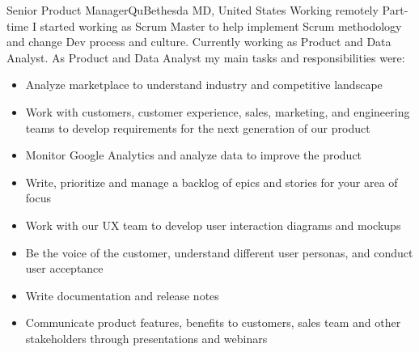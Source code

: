 \documentclass[11pt,a4paper,sans]{moderncv}
\begin{document}
 {Senior Product Manager}{Qu}{Bethesda MD, United States \- Working remotely \- Part-time }{}
{
  I started working as Scrum Master to help implement Scrum methodology and change Dev process and culture. Currently working as Product and Data Analyst.
  \newline{}
}
{
  As Product and Data Analyst my main tasks and responsibilities were:
}
\begin{itemize}
  \item Analyze marketplace to understand industry and competitive landscape
  \item Work with customers, customer experience, sales, marketing, and engineering teams to develop requirements for the next generation of our product
  \item Monitor Google Analytics and analyze data to improve the product
  \item Write, prioritize and manage a backlog of epics and stories for your area of focus
  \item Work with our UX team to develop user interaction diagrams and mockups
  \item Be the voice of the customer, understand different user personas, and conduct user acceptance
  \item Write documentation and release notes
  \item Communicate product features, benefits to customers, sales team and other stakeholders through presentations and webinars
\newline{}
\end{itemize}
\end{document}
